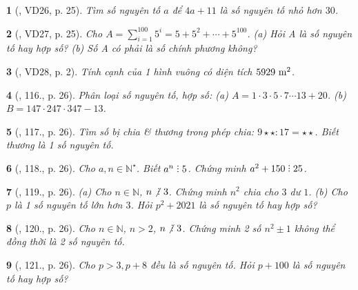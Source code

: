 \documentclass{article}
\newtheorem{baitoan}{}
\DeclareRobustCommand{\divby}{%
	\mathrel{\vbox{\baselineskip.65ex\lineskiplimit0pt\hbox{.}\hbox{.}\hbox{.}}}%
}
\begin{document}
\begin{baitoan}[\cite{Tuyen_Toan_6}, VD26, p. 25]
	Tìm số nguyên tố $a$ để $4a + 11$ là số nguyên tố nhỏ hơn $30$.
\end{baitoan}

\begin{baitoan}[\cite{Tuyen_Toan_6}, VD27, p. 25]
	Cho $A = \sum_{i=1}^{100} 5^i = 5 + 5^2 + \cdots + 5^{100}$. (a) Hỏi A là số nguyên tố hay hợp số? (b) Số A có phải là số chính phương không?
\end{baitoan}

\begin{baitoan}[\cite{Tuyen_Toan_6}, VD28, p. 2]
	Tính cạnh của 1 hình vuông có diện tích $\rm5929\ m^2$.
\end{baitoan}

\begin{baitoan}[\cite{Tuyen_Toan_6}, 116., p. 26]
	Phân loại số nguyên tố, hợp số: (a) $A = 1\cdot3\cdot5\cdot7\cdots13 + 20$. (b) $B = 147\cdot247\cdot347 - 13$.
\end{baitoan}

\begin{baitoan}[\cite{Tuyen_Toan_6}, 117., p. 26]
	Tìm số bị chia \& thương trong phép chia: $9\star\star:17 = \star\star$. Biết thương là 1 số nguyên tố.
\end{baitoan}

\begin{baitoan}[\cite{Tuyen_Toan_6}, 118., p. 26]
	Cho $a,n\in\mathbb{N}^\star$. Biết $a^n\divby5$. Chứng minh $a^2 + 150\divby25$.
\end{baitoan}

\begin{baitoan}[\cite{Tuyen_Toan_6}, 119., p. 26]
	(a) Cho $n\in\mathbb{N}$, $n\not{\divby}\ 3$. Chứng minh $n^2$ chia cho $3$ dư $1$. (b) Cho $p$ là 1 số nguyên tố lớn hơn $3$. Hỏi $p^2 + 2021$ là số nguyên tố hay hợp số?
\end{baitoan}

\begin{baitoan}[\cite{Tuyen_Toan_6}, 120., p. 26]
	Cho $n\in\mathbb{N}$, $n > 2$, $n\not{\divby}\ 3$. Chứng minh 2 số $n^2\pm1$ không thể đồng thời là 2 số nguyên tố.
\end{baitoan}

\begin{baitoan}[\cite{Tuyen_Toan_6}, 121., p. 26]
	Cho $p > 3,p + 8$ đều là số nguyên tố. Hỏi $p + 100$ là số nguyên tố hay hợp số?
\end{baitoan}
\end{document}
